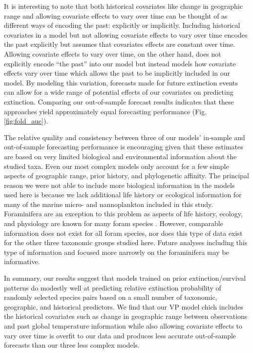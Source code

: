 \documentclass[12pt,letterpaper]{article}
\begin{document}
\begin{refsection}
It is interesting to note that both historical covariates like change in geographic range and allowing covariate effects to vary over time can be thought of as different ways of encoding the past: explicitly or implicitly. Including historical covariates in a model but not allowing covariate effects to vary over time encodes the past explicitly but assumes that covariates effects are constant over time. Allowing covariate effects to vary over time, on the other hand, does not explicitly encode ``the past'' into our model but instead models how covariate effects vary over time which allows the past to be implicitly included in our model. By modeling this variation, forecasts made for future extinction events can allow for a wide range of potential effects of our covariates on predicting extinction. Comparing our out-of-sample forecast results indicates that these approaches yield approximately equal forecasting performance (Fig. \ref{fig:fold_auc}).


The relative quality and consistency between three of our models' in-sample and out-of-sample forecasting performance is encouraging given that these estimates are based on very limited biological and environmental information about the studied taxa. Even our most complex models only account for a few simple aspects of geographic range, prior history, and phylogenetic affinity. The principal reason we were not able to include more biological information in the models used here is because we lack additional life history or ecological information for many of the marine micro- and nannoplankton included in this study. Foraminifera are an exception to this problem as aspects of life history, ecology, and physiology are known for many foram species \citep{Ezard2011}. However, comparable information does not exist for all foram species, nor does this type of data exist for the other three taxonomic groups studied here. Future analyses including this type of information and focused more narrowly on the foraminifera may be informative. 

In summary, our results suggest that models trained on prior extinction/survival patterns do modestly well at predicting relative extinction probability of randomly selected species pairs based on a small number of taxonomic, geographic, and historical predictors. We find that our VP model chich includes the historical covariates such as change in geographic range between observations and past global temperature information while also allowing covariate effects to vary over time is overfit to our data and produces less accurate out-of-sample forecasts than our three less complex models. 


\end{refsection}
\end{document}
